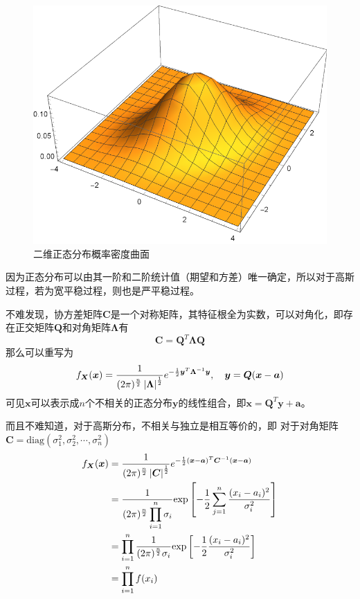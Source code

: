     \begin{figure}[H]
        \centering
        \includegraphics[scale=0.8]{body/image/2DNormalDistribution.pdf}
        \caption{二维正态分布概率密度曲面}
        \label{fig:2DNormalDistribution}
    \end{figure}

    因为正态分布可以由其一阶和二阶统计值（期望和方差）唯一确定，所以对于高斯过程，若为宽平稳过程，则也是严平稳过程。

    不难发现，协方差矩阵$\bm C$是一个对称矩阵，其特征根全为实数，可以对角化，即存在正交矩阵$\bm Q$和对角矩阵$\bm \Lambda$有
    \begin{equation}
        \bm C=\bm Q^T\bm\Lambda \bm Q
    \end{equation}
    那么可以重写为
    \begin{equation}
        f_{\bm X}(\bm x)=\frac{1}{(2\pi)^{\frac{n}{2}}\left\vert \bm \Lambda \right\vert^\frac{1}{2}}e^{-\frac{1}{2}\bm y^T\bm \Lambda^{-1}\bm y},\hspace{1em}\bm y=\bm Q(\bm x - \bm a)
    \end{equation}
    可见$\bm x$可以表示成$n$个不相关的正态分布$\bm y$的线性组合，即$\bm x=\bm Q^T\bm y+\bm a$。

    而且不难知道，对于高斯分布，不相关与独立是相互等价的，即
    对于对角矩阵$\bm C=\text{diag}(\sigma_1^2,\sigma_2^2,\cdots,\sigma_n^2)$
    \begin{equation}
        \begin{split}
            f_{\bm X}(\bm x)    &=\frac{1}{(2\pi)^{\frac{n}{2}}\left\vert \bm C \right\vert^\frac{1}{2}}e^{-\frac{1}{2}(\bm x - \bm a)^T\bm C^{-1}(\bm x - \bm a)}\\
                                &=\frac{1}{(2\pi)^{\frac{n}{2}}\displaystyle\prod_{i=1}^{n}\sigma_i}\text{exp}\left[-\frac{1}{2}\sum_{j=1}^{n}\frac{(x_i-a_i)^2}{\sigma_i^2}\right]\\
                                &=\prod_{i=1}^{n}\frac{1}{(2\pi)^{\frac{n}{2}}\sigma_i}\text{exp}\left[-\frac{1}{2}\frac{(x_i-a_i)^2}{\sigma_i^2}\right]\\
                                &=\prod_{i=1}^{n}f(x_i)
        \end{split}
    \end{equation}

